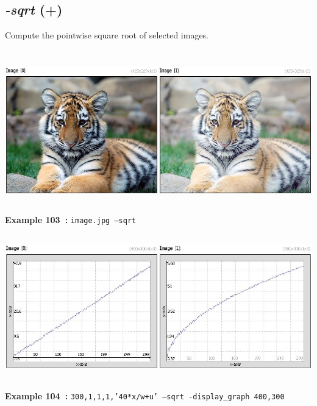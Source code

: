 \documentclass[a4paper,11pt,twoside]{book}
\begin{document}
\subsection{\emph{-sqrt} (+)}\vspace*{-0.5em}
Compute the pointwise square root of selected images.
\begin{center}\includegraphics[keepaspectratio=true,height=7cm,width=\textwidth]{img/gmic_def103.jpg}\\
{\footnotesize \textbf{Example 103~:} \texttt{image.jpg --sqrt}}
\\\includegraphics[keepaspectratio=true,height=7cm,width=\textwidth]{img/gmic_def104.jpg}\\
{\footnotesize \textbf{Example 104~:} \texttt{300,1,1,1,'40*x/w+u' --sqrt -display\_graph 400,300}}
\end{center}
\end{document}
